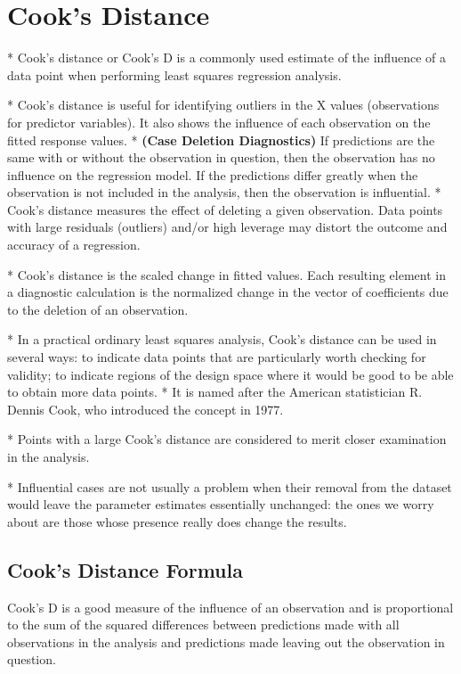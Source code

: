 
\section{Cook's Distance}

*  Cook's distance or Cook's D is a commonly used estimate of the influence of a data point when performing least squares regression analysis.

*  Cook's distance is useful for identifying outliers in the X values (observations for predictor variables). It also shows the influence of each observation on the fitted response values. 
*  \textbf{(Case Deletion Diagnostics)} If  predictions are the same with or without the observation in question, then the observation has no influence on the regression model. If the predictions differ greatly when the observation is not included in the analysis, then the observation is influential.
 *  Cook's distance measures the effect of deleting a given observation. Data points with large residuals (outliers) and/or high leverage may distort the outcome and accuracy of a regression. 



*  
Cook's distance is the scaled change in fitted values. Each resulting element in a diagnostic calculation is the normalized change in the vector of coefficients due to the deletion of an observation. 

*  In a practical ordinary least squares analysis, Cook's distance can be used in several ways: to indicate data points that are particularly worth checking for validity; to indicate regions of the design space where it would be good to be able to obtain more data points. 
*  
It is named after the American statistician R. Dennis Cook, who introduced the concept in 1977.


*  Points with a large Cook's distance are considered to merit closer examination in the analysis. 

*  Influential cases are not usually a problem when their removal from the dataset would leave the parameter estimates essentially unchanged: the ones we worry about are those whose presence really does change the results. 


\subsection*{Cook's Distance Formula}
Cook's D is a good measure of the influence of an observation and is proportional to the sum of the squared differences 
between predictions made with all observations in the analysis and predictions made leaving out the observation in question.

